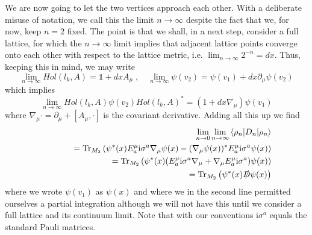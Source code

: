 \documentclass[12pt]{article}
\newcommand{\nn}{\nonumber}
\def\m{\mu}
\newcommand{\pa}{\partial}
\begin{document}
We are now going to let the two vertices approach each other. With a deliberate misuse of notation, we call this the limit $n\rightarrow\infty$ despite the fact that we, for now, keep $n=2$ fixed. The point is that we shall, in a next step, consider a full lattice, for which the $n\rightarrow\infty$ limit implies that adjacent lattice points converge onto each other with respect to the lattice metric, i.e. $\lim_{n\rightarrow\infty} 2^{-n} =dx$.
Thus, keeping this in mind, we may write
$$
\lim_{n\rightarrow\infty}   Hol(l_k,A) = \mathds{1} + dx A_\m \;,\quad \lim_{n\rightarrow\infty} \psi(v_2) = \psi(v_1) + dx \pa_\m \psi(v_2)
$$
which implies
$$
\lim_{n\rightarrow\infty} Hol(l_k,A)  \psi(v_2) Hol(l_k,A)^* = (1+dx \nabla_\m)\psi(v_1)
$$
where $\nabla_\m\cdot = \pa_\m + [A_\m,\cdot]$ is the covariant derivative. Adding all this up we find
\begin{eqnarray}
&&\hspace{-1cm}\lim_{\kappa\rightarrow 0} \lim_{n\rightarrow\infty}  \left\langle \rho_n \vert D_n \vert \rho_n\right\rangle 
\nn\\
&&\hspace{1cm}=  \mbox{Tr}_{M_2} \left( \psi^*(x) E^\m_a  \mathrm{i} \sigma^a \nabla_\m  \psi(x)  -  ( \nabla_\m \psi(x) )^*  E^\m_a \mathrm{i}\sigma^a   \psi(x)  \right)
\nn\\
&&\hspace{1cm} =\mbox{Tr}_{M_2} \left(  \psi^*(x)  (   E^\m_a \mathrm{i}\sigma^a \nabla_\m + \nabla_\m  E^\m_a  \mathrm{i} \sigma^a ) \psi(x)   \right)
\nn\\
&&\hspace{1cm} =\mbox{Tr}_{M_2} \left(  \psi^*(x) \slashed{D} \psi(x)   \right)
\end{eqnarray}
where we wrote $\psi(v_1)$ as $\psi(x)$ and where we in the second line permitted ourselves a partial integration although we will not have this until we consider a full lattice and its continuum limit. Note that with our conventions $ \mathrm{i} \sigma^a$ equals the standard Pauli matrices.
\end{document}
